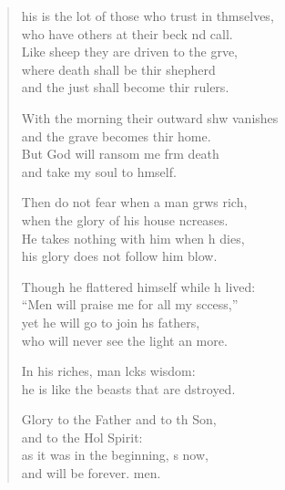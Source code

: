 \settowidth{\versewidth}{This is the lot of those who trust in themselves, *}
\begin{verse}%
  \begin{patverse}
his is the lot of those who trust in thmselves,\Med\\
who have others at their beck nd call.\\
Like sheep they are driven to the grve,\Flex\\
where death shall be thir shepherd\Med\\
and the just shall become thir rulers.

With the morning their outward shw vanishes\Med\\
and the grave becomes thir home.\\
But God will ransom me frm death\Med\\
and take my soul to h\pointup{\i}mself.

Then do not fear when a man grws rich,\Med\\
when the glory of his house \pointup{\i}ncreases.\\
He takes nothing with him when h dies,\Med\\
his glory does not follow him blow.

Though he flattered himself while h lived:\Med\\
“Men will praise me for all my sccess,”\\
yet he will go to join h\pointup{\i}s fathers,\Med\\
who will never see the light an more.

In his riches, man lcks wisdom:\Med\\
he is like the beasts that are dstroyed.

Glory to the Father and to th Son,\Med\\
and to the Hol Spirit:\\
as it was in the beginning, \pointup{\i}s now,\Med\\
and will be forever. men. 
  \end{patverse}
\end{verse}
